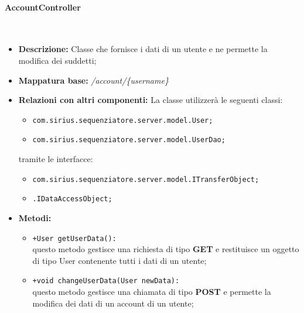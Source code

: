 \paragraph{AccountController}%
\
\begin{itemize}
	\item \textbf{Descrizione: } Classe che fornisce i dati di un utente e ne permette la modifica dei suddetti;
	\item \textbf{Mappatura base: } \textit{\slash account\slash \{username\}}
	\item \textbf{Relazioni con altri componenti: }
	La classe utilizzerà le seguenti classi:
	\begin{itemize}
		\item \texttt{com.sirius.sequenziatore.server.model.User;}
		\item \texttt{com.sirius.sequenziatore.server.model.UserDao;}
	\end{itemize}
	tramite le interfacce:
	\begin{itemize}
		\item \texttt{com.sirius.sequenziatore.server.model.ITransferObject;}
		\item \texttt{\sModel .IDataAccessObject;}
	\end{itemize}
	\item \textbf{Metodi: }\begin{itemize}
					\item \texttt{+User getUserData():}\\
					questo metodo gestisce una richiesta di tipo \textbf{GET} e restituisce un oggetto di tipo User contenente tutti i dati di un utente;
					\item \texttt{+void changeUserData(User newData):}\\
					questo metodo gestisce una chiamata di tipo \textbf{POST} e permette la modifica dei dati di un account di un utente;
				\end{itemize}
\end{itemize}
